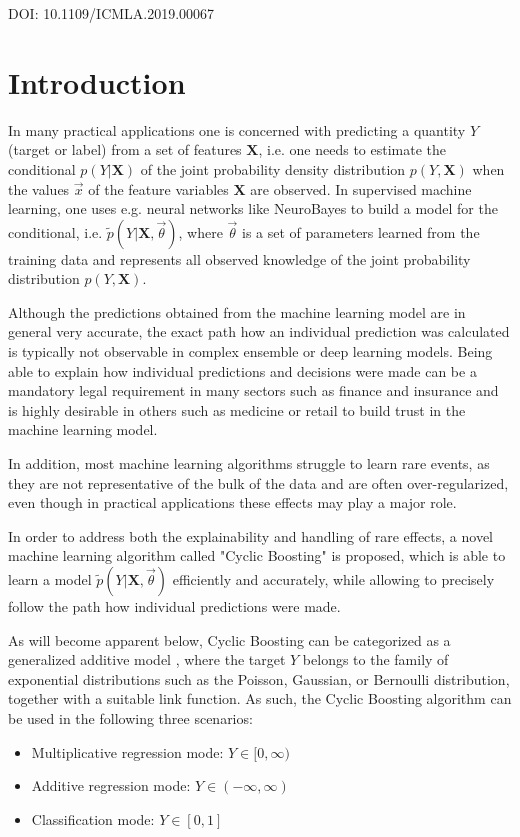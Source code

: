 \documentclass[BCOR=1mm, DIV=calc,10pt,
twoside=true,
twocolumn,
headings=normal]{scrartcl}
\begin{document}
{DOI:  10.1109/ICMLA.2019.00067}


\section{Introduction}

In many practical applications one is concerned with predicting a quantity $Y$ (target or
label) from a set of features $\bm{X}$, i.e. one needs to estimate the conditional
$p(Y|\bm{X})$ of the joint probability density distribution $p(Y,\bm{X})$ when the values
$\vec{x}$ of the feature variables $\bm{X}$ are observed. In supervised machine learning,
one uses e.g. neural networks like NeuroBayes \cite{NeuroBayes} to build a model for the
conditional, i.e. $\tilde{p}(Y|\bm{X},\vec{\theta})$, where $\vec{\theta}$ is a set of
parameters learned from  the training data and represents all observed knowledge of the
joint probability distribution $p(Y,\bm{X})$.

Although the predictions obtained from the machine learning model are in general very
accurate, the exact path how an individual prediction was calculated is typically not
observable in complex ensemble or deep learning models. Being able to explain how
individual predictions and decisions were made can be a mandatory legal requirement in
many sectors such as finance and insurance and is highly desirable in others such as
medicine or retail to build trust in the machine learning model.

In addition, most machine learning algorithms struggle to learn rare events, as they are
not representative of the bulk of the data and are often over-regularized, even though in
practical applications these effects may play a major role.

In order to address both the explainability and handling of rare effects, a novel machine
learning algorithm called "Cyclic Boosting" is proposed, which is able to learn a model
$\tilde{p}(Y|\bm{X},\vec{\theta})$ efficiently and accurately, while allowing to precisely
follow the path how individual predictions were made.

As will become apparent below, Cyclic Boosting can be categorized as a generalized
additive model \cite{GAM}, where the target $Y$ belongs to the family of exponential
distributions such as the Poisson, Gaussian, or Bernoulli distribution, together with a
suitable link function. As such, the Cyclic Boosting algorithm can be used in the
following three scenarios:
\begin{itemize}
\item{Multiplicative regression mode: $Y \in [0, \infty)$}
\item{Additive regression mode: $Y \in (-\infty, \infty)$}
\item{Classification mode: $Y \in [0, 1]$}
\end{itemize}
\end{document}
